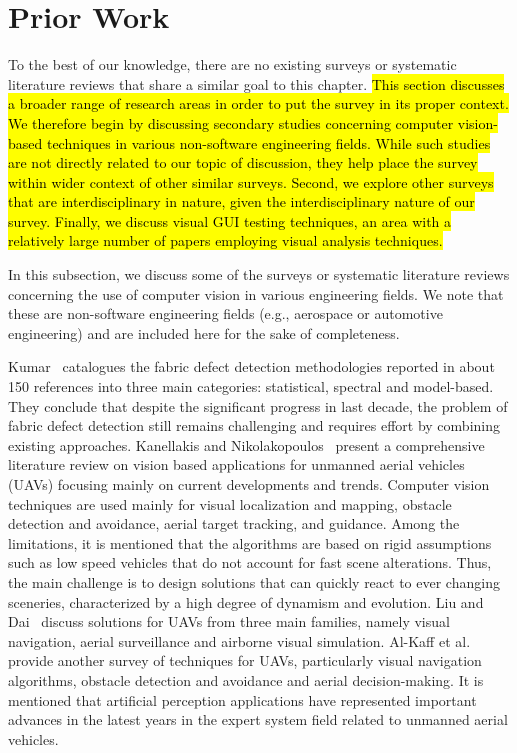 \section{Prior Work}\label{sec:related}

To the best of our knowledge, 
there are no existing surveys or systematic literature reviews that 
share a similar goal to this chapter. 
\hl{
This section discusses  
a broader range of research areas in order to put 
the survey in its proper context.
We therefore begin by discussing secondary studies concerning 
computer vision-based techniques 
in various non-software engineering fields. 
While such studies are not directly related to our topic of discussion, 
they help place the survey within wider context of other similar surveys. 
Second, we explore other surveys that 
are interdisciplinary in nature, 
given the interdisciplinary nature of our survey.
Finally, we discuss visual GUI testing 
techniques, an area with a relatively large 
number of papers employing visual analysis techniques. 
}


In this subsection, we discuss some of the surveys or systematic literature reviews 
concerning the use of computer vision in various engineering fields. 
We note that these are non-software engineering fields 
(e.g., aerospace or automotive engineering) 
and are included here for the sake of completeness. 

Kumar~\cite{cv-fabric-defect} catalogues the 
fabric defect detection methodologies reported 
in about 150 references into three main categories: 
statistical, spectral and model-based. 
They conclude that despite the significant progress 
in last decade, the problem of fabric defect detection 
still remains challenging and requires effort by 
combining existing approaches. 
%
Kanellakis and Nikolakopoulos~\cite{cv-for-uavs} 
present a comprehensive literature review on vision 
based applications for unmanned aerial vehicles (UAVs) focusing mainly on current 
developments and trends. Computer vision techniques are used 
mainly for visual localization and mapping, 
obstacle detection and avoidance, aerial target 
tracking, and guidance. Among the limitations, 
it is mentioned that the algorithms are based on 
rigid assumptions such as low speed vehicles 
that do not account for fast scene alterations. 
Thus, the main challenge is to design solutions 
that can quickly react to ever changing sceneries, 
characterized by a high degree of dynamism and evolution. 
%
Liu and Dai~\cite{5508131} discuss solutions 
for UAVs from three main families, namely visual 
navigation, aerial surveillance and airborne 
visual simulation.
%
Al-Kaff et al.~\cite{ALKAFF2018447} provide another 
survey of techniques for UAVs, particularly 
visual navigation algorithms, obstacle detection 
and avoidance and aerial decision-making. It is 
mentioned that artificial perception applications 
have represented important advances in the latest 
years in the expert system field related to unmanned aerial vehicles. 

